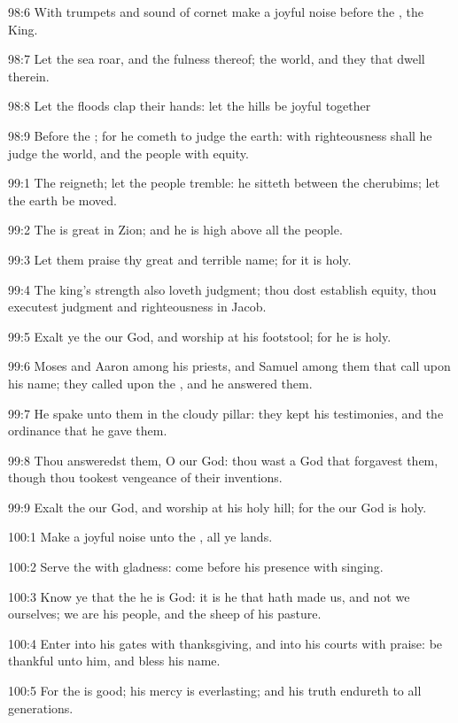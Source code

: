 98:6 With trumpets and sound of cornet make a joyful noise before the \LORD, the King.

98:7 Let the sea roar, and the fulness thereof; the world, and they that dwell therein.

98:8 Let the floods clap their hands: let the hills be joyful together

98:9 Before the \LORD; for he cometh to judge the earth: with righteousness shall he judge the world, and the people with equity.



99:1 The \LORD reigneth; let the people tremble: he sitteth between the cherubims; let the earth be moved.

99:2 The \LORD is great in Zion; and he is high above all the people.

99:3 Let them praise thy great and terrible name; for it is holy.

99:4 The king's strength also loveth judgment; thou dost establish equity, thou executest judgment and righteousness in Jacob.

99:5 Exalt ye the \LORD our God, and worship at his footstool; for he is holy.

99:6 Moses and Aaron among his priests, and Samuel among them that call upon his name; they called upon the \LORD, and he answered them.

99:7 He spake unto them in the cloudy pillar: they kept his testimonies, and the ordinance that he gave them.

99:8 Thou answeredst them, O \LORD our God: thou wast a God that forgavest them, though thou tookest vengeance of their inventions.

99:9 Exalt the \LORD our God, and worship at his holy hill; for the \LORD our God is holy.



100:1 Make a joyful noise unto the \LORD, all ye lands.

100:2 Serve the \LORD with gladness: come before his presence with singing.

100:3 Know ye that the \LORD he is God: it is he that hath made us, and not we ourselves; we are his people, and the sheep of his pasture.

100:4 Enter into his gates with thanksgiving, and into his courts with praise: be thankful unto him, and bless his name.

100:5 For the \LORD is good; his mercy is everlasting; and his truth endureth to all generations.



